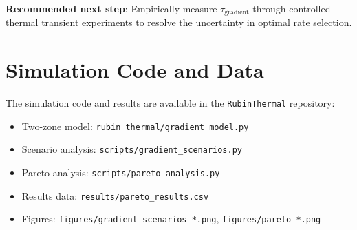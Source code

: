 \documentclass[11pt,a4paper]{article}
\begin{document}
\vspace{1em}
\noindent\textbf{Recommended next step}: Empirically measure $\tau_{\text{gradient}}$ through controlled thermal transient experiments to resolve the uncertainty in optimal rate selection.

\appendix
\section{Simulation Code and Data}

The simulation code and results are available in the \texttt{RubinThermal} repository:

\begin{itemize}
    \item Two-zone model: \texttt{rubin\_thermal/gradient\_model.py}
    \item Scenario analysis: \texttt{scripts/gradient\_scenarios.py}
    \item Pareto analysis: \texttt{scripts/pareto\_analysis.py}
    \item Results data: \texttt{results/pareto\_results.csv}
    \item Figures: \texttt{figures/gradient\_scenarios\_*.png}, \texttt{figures/pareto\_*.png}
\end{itemize}
\end{document}
